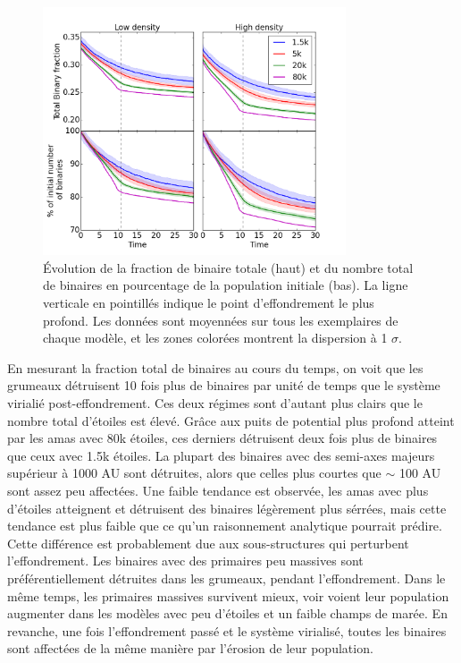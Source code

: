 \begin{figure}
\begin{center}
\includegraphics[width=0.8\textwidth]{Figures/6_TotBinFrac_vs_time_dispersion}
\caption{\'Evolution de la fraction de binaire totale (haut) et du nombre total de binaires en pourcentage de la population initiale (bas). La ligne verticale en pointill\'es indique le point d'effondrement le plus profond. Les donn\'ees sont moyenn\'ees sur tous les exemplaires de chaque mod\`ele, et les zones color\'ees montrent la dispersion \`a 1 $\sigma$.}
\label{Fig:resume_TotBinFrac}
\end{center}
\end{figure}

En mesurant la fraction total de binaires au cours du temps, on voit que les grumeaux d\'etruisent 10 fois plus de binaires par unit\'e de temps que le syst\`eme viriali\'e post-effondrement. Ces deux r\'egimes sont d'autant plus clairs que le nombre total d'\'etoiles est \'elev\'e. Gr\^ace aux puits de potential plus profond atteint par les amas avec 80k \'etoiles, ces derniers d\'etruisent deux fois plus de binaires que ceux avec 1.5k \'etoiles. La plupart des binaires avec des semi-axes majeurs sup\'erieur \`a 1000 AU sont d\'etruites, alors que celles plus courtes que $\sim$ 100 AU sont assez peu affect\'ees. Une faible tendance est observ\'ee, les amas avec plus d'\'etoiles atteignent et d\'etruisent des binaires l\'eg\`erement plus s\'err\'ees, mais cette tendance est plus faible que ce qu'un raisonnement analytique pourrait pr\'edire. Cette diff\'erence est probablement due aux sous-structures qui perturbent l'effondrement. Les binaires avec des primaires peu massives sont pr\'ef\'erentiellement d\'etruites dans les grumeaux, pendant l'effondrement. Dans le m\^eme temps, les primaires massives survivent mieux, voir voient leur population augmenter dans les mod\`eles avec peu d'\'etoiles et un faible champs de mar\'ee. En revanche, une fois l'effondrement pass\'e et le syst\`eme virialis\'e, toutes les binaires sont affect\'ees de la m\^eme mani\`ere par l'\'erosion de leur population.

